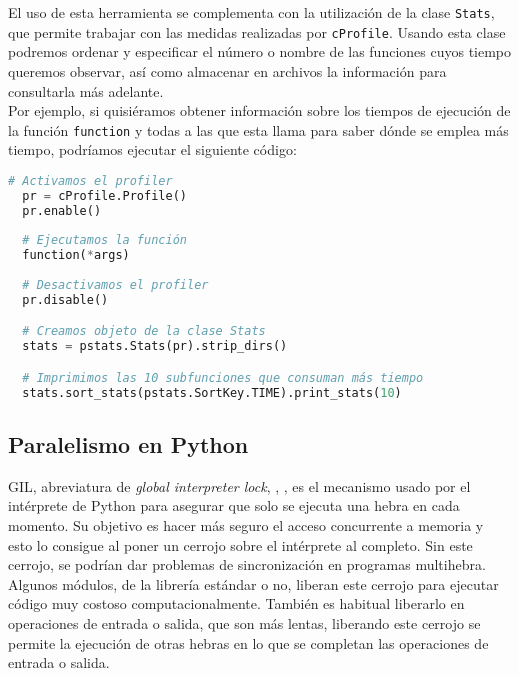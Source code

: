 \documentclass[12pt,a4paper]{report} %
\theoremstyle{definition}
\begin{document}
El uso de esta herramienta se complementa con la utilización de la clase \texttt{Stats}, que permite trabajar con las medidas realizadas por \texttt{cProfile}. Usando esta clase podremos ordenar y especificar el número o nombre de las funciones cuyos tiempo queremos observar, así como almacenar en archivos la información para consultarla más adelante.\\

Por ejemplo, si quisiéramos obtener información sobre los tiempos de ejecución de la función \texttt{function} y todas a las que esta llama para saber dónde se emplea más tiempo, podríamos ejecutar el siguiente código:\\

\begin{lstlisting}[language=Python]
  # Activamos el profiler
  pr = cProfile.Profile()
  pr.enable()
  
  # Ejecutamos la función
  function(*args)
  
  # Desactivamos el profiler
  pr.disable()

  # Creamos objeto de la clase Stats
  stats = pstats.Stats(pr).strip_dirs()

  # Imprimimos las 10 subfunciones que consuman más tiempo
  stats.sort_stats(pstats.SortKey.TIME).print_stats(10)
\end{lstlisting}

\subsection{Paralelismo en Python}
GIL, abreviatura de \textit{global interpreter lock}, \cite{glossary_GIL}, \cite{GIL}, es el mecanismo usado por el intérprete de Python para asegurar que solo  se ejecuta una hebra en cada momento. Su objetivo es hacer más seguro el acceso concurrente a memoria y esto lo consigue al poner un cerrojo sobre el intérprete al completo. Sin este cerrojo, se podrían dar problemas de sincronización en programas multihebra.\\

Algunos módulos, de la librería estándar o no, liberan este cerrojo para ejecutar código muy costoso computacionalmente. También es habitual liberarlo en operaciones de entrada o salida, que son más lentas, liberando este cerrojo se permite la ejecución de otras hebras  en lo que se completan las operaciones de entrada o salida.\\
\end{document}
